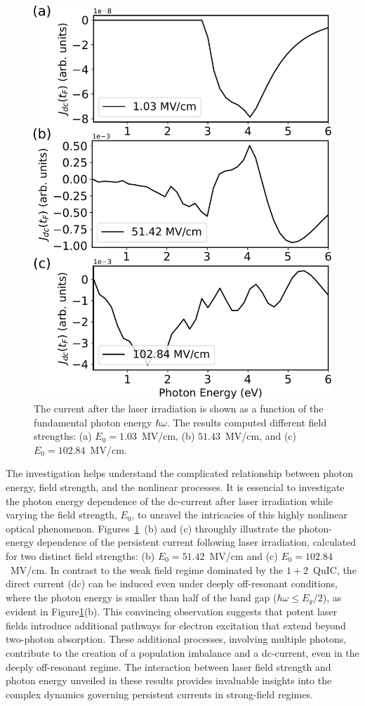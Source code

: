 \begin{figure}[htb]
\centering
\includegraphics[width=0.8\linewidth]{pic/frequency.pdf}
\caption{\label{fig:fig4} 
The current after the laser irradiation is shown as a function of the fundamental photon energy $\hbar \omega$. The results computed different field strengths: (a) $E_0=1.03$~MV/cm, (b) $51.43$~MV/cm, and (c) $E_0=102.84$~MV/cm.}
\end{figure}

 The investigation helps understand the complicated relationship between photon energy, field strength, and the nonlinear processes. It is essencial to investigate the photon energy dependence of the dc-current after laser irradiation while varying the field strength, $E_0$, to unravel the intricacies of this highly nonlinear optical phenomenon. 
 Figures~\ref{fig:fig4}~(b) and (c) throughly illustrate the photon-energy dependence of the persistent current following laser irradiation, calculated for two distinct field strengths: (b) $E_0=51.42$~MV/cm and (c) $E_0=102.84$~MV/cm. In contrast to the weak field regime dominated by the $1+2$~\gls{QuIC}, the direct current (dc) can be induced even under deeply off-resonant conditions, where the photon energy is smaller than half of the band gap ($\hbar \omega \le E_g/2$), as evident in Figure\ref{fig:fig4}(b). This convincing observation suggests that potent laser fields introduce additional pathways for electron excitation that extend beyond two-photon absorption. These additional processes, involving multiple photons, contribute to the creation of a population imbalance and a dc-current, even in the deeply off-resonant regime. The interaction between laser field strength and photon energy unveiled in these results provides invaluable insights into the complex dynamics governing persistent currents in strong-field regimes.

